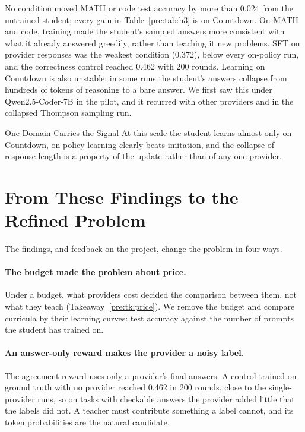 No condition moved MATH or code test accuracy by more than 0.024 from the untrained student;
every gain in Table~\ref{pre:tab:h3} is on Countdown. On MATH and code, training made the
student's sampled answers more consistent with what it already answered greedily, rather
than teaching it new problems. SFT on provider responses was the weakest condition (0.372),
below every on-policy run, and the correctness control reached 0.462 with 200 rounds.
Learning on Countdown is also unstable: in some runs the student's answers collapse from
hundreds of tokens of reasoning to a bare answer. We first saw this under Qwen2.5-Coder-7B
in the pilot, and it recurred with other providers and in the collapsed Thompson sampling
run.

\begin{takeaway}{One Domain Carries the Signal}
\label{pre:tk:countdown}
At this scale the student learns almost only on Countdown, on-policy learning clearly beats
imitation, and the collapse of response length is a property of the update rather than of
any one provider.
\end{takeaway}

\section{From These Findings to the Refined Problem}
\label{pre:sec:refined}

The findings, and feedback on the project, change the problem in four ways.

\paragraph{The budget made the problem about price.} Under a budget, what
providers cost decided the comparison between them, not what they teach
(Takeaway~\ref{pre:tk:price}). We remove the budget and compare curricula by their learning
curves: test accuracy against the number of prompts the student has trained on.

\paragraph{An answer-only reward makes the provider a noisy label.} The agreement reward
uses only a provider's final answers. A control trained on ground truth with no provider
reached 0.462 in 200 rounds, close to the single-provider runs, so on tasks with checkable
answers the provider added little that the labels did not. A teacher must contribute
something a label cannot, and its token probabilities are the natural candidate.

